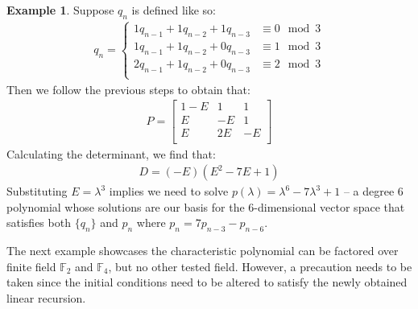\documentclass[a4paper]{article}
\theoremstyle{definition}
\newtheorem{example}{Example}[section]
\begin{document}
\begin{example}

Suppose $q_n$ is defined like so:
\begin{align*}
q_n=
\begin{cases}
1q_{n-1}+1q_{n-2}+1q_{n-3} & \equiv 0 \mod 3 \\
1q_{n-1}+1q_{n-2}+0q_{n-3} & \equiv 1 \mod 3 \\
2q_{n-1}+1q_{n-2}+0q_{n-3} & \equiv 2 \mod 3 \\
\end{cases}
\end{align*}
Then we follow the previous steps to obtain that:
\begin{align*}
P=
\begin{bmatrix}
    1-E & 1  & 1  \\
    E   & -E & 1  \\
    E   & 2E & -E \\
\end{bmatrix}
\end{align*}
Calculating the determinant, we find that:
\begin{align*}
D=(-E)(E^2-7E+1)
\end{align*}
Substituting $E=\lambda^3$ implies we need to solve $p(\lambda)=\lambda^6-7\lambda^3+1$ -- a degree 6
polynomial whose solutions are our basis for the 6-dimensional vector space that satisfies both
$\{q_n\}$ and ${p_n}$ where $p_n=7p_{n-3}-p_{n-6}$.
\end{example}

The next example showcases the characteristic polynomial can be factored over finite field
$\mathbb{F}_2$ and $\mathbb{F}_4$, but no other tested field. However, a precaution needs to be taken
since the initial conditions need to be altered to satisfy the newly obtained linear recursion. 
\end{document}
